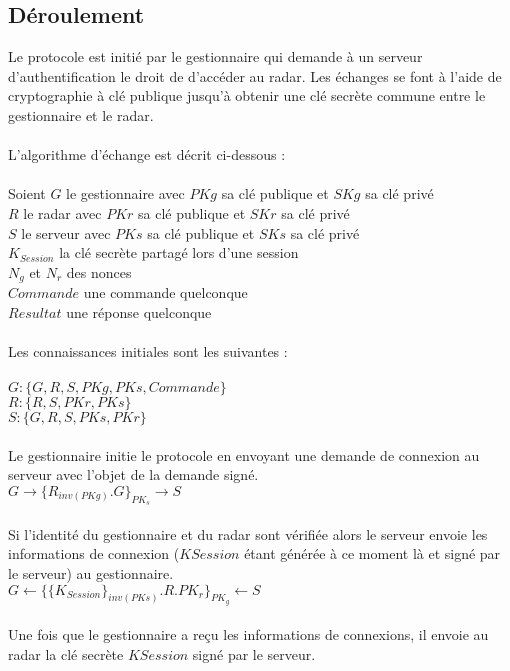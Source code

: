 \documentclass[]{scrartcl}
\begin{document}
\subsection{Déroulement}

Le protocole est initié par le gestionnaire qui demande à un serveur d'authentification le droit de d'accéder au radar. Les échanges se font à l'aide de cryptographie à clé publique jusqu'à obtenir une clé secrète commune entre le gestionnaire et le radar. 
\\
\\
L'algorithme d'échange est décrit ci-dessous : 
\\
\\
Soient 
$G$ le gestionnaire avec $PKg$ sa clé publique et  $SKg$ sa clé privé
\\
$R$ le radar avec $PKr$ sa clé publique et  $SKr$ sa clé privé
\\
$S$ le serveur avec $PKs$ sa clé publique et  $SKs$ sa clé privé
\\
$K_{Session}$ la clé secrète partagé lors d'une session
\\
$N_{g}$ et $N_{r}$ des nonces
\\
$Commande$ une commande quelconque
\\
$Resultat$ une réponse quelconque
\\
\\
Les connaissances initiales sont les suivantes :
\\
\\
$G : \{G, R, S, PKg, PKs, Commande\}$
\\
$R : \{R, S, PKr, PKs\}$
\\
$S : \{G, R, S, PKs, PKr\}$
\\
\\
Le gestionnaire initie le protocole en envoyant une demande de connexion au serveur avec l'objet de la demande signé.
\\
$G \rightarrow \{{R}_{inv(PKg)}.G\}_{PK_{s}} \longrightarrow S$
\\
\\
Si l'identité du gestionnaire et du radar sont vérifiée alors le serveur envoie les informations de connexion ($KSession$ étant générée à ce moment là et signé par le serveur) au gestionnaire.
\\
$G \longleftarrow \{\{K_{Session}\}_{inv(PKs)}.R.PK_{r}\}_{PK_{g}} \leftarrow S$
\\
\\
Une fois que le gestionnaire a reçu les informations de connexions, il envoie au radar la clé secrète $KSession$ signé par le serveur.
\end{document}
